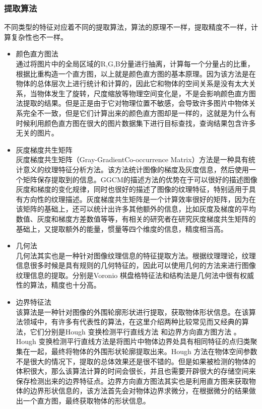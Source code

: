 \subsubsection{提取算法}
不同类型的特征对应着不同的提取算法，算法的原理不一样，提取精度不一样，计算复杂性也不一样。
\begin{itemize}
\item 颜色直方图法\\通过将图片中的全局区域的R,G,B分量进行抽离，计算每一个分量占的比重，根据比重构造一个直方图，以上就是颜色直方图的基本原理。因为该方法是在物体的总体层次上进行统计和计算的，因此它和物体的空间关系是没有太大关系，当物体发生了旋转，尺度缩放等物理空间变化是，不是会影响颜色直方图法提取的结果。但是正是由于它对物理位置不敏感，会导致许多图片中物体关系完全不一致，但是它们计算出来的颜色直方图却是一样的，这就是为什么有时候利用颜色直方图在很大的图片数据集下进行目标查找，查询结果包含许多无关的图片。
\item 灰度梯度共生矩阵\\ 灰度梯度共生矩阵（Gray-GradientCo-occurrence Matrix）方法是一种具有统计意义的纹理特征分析方法。该方法统计图像的梯度及灰度信息，然后使用一个矩阵保存提取到的信息。GGCM的描述方法的优势在于可以很好的描述图像灰度和梯度的变化规律，同时也很好的描述了图像的纹理特征，特别适用于具有方向性的纹理描述。灰度梯度共生矩阵是一个计算效率很好的矩阵，因为在该矩阵的基础上，还可以统计出许多其他额外的信息，比如灰度及梯度的平均数值、灰度和梯度方差数值等等，有相关的研究者在研究灰度梯度共生矩阵的基础上，又提取额外的能量，惯量等四个维度的信息，精度相当高。
\item 几何法\\几何法其实也是一种针对图像纹理信息的特征提取方法。根据纹理理论，纹理信息很多时候是具有规则的几何特征的，因此可以使用几何的方法来进行图像纹理信息的提取。分别是Voronio 棋盘格特征法和结构法是几何法中很有权威性的算法，精度也十分高。
\item 边界特征法\\该算法是一种针对图像的外围轮廓形状进行提取，获取物体形状信息。在该算法领域中，有许多有代表性的算法，在这里介绍两种比较常见而又经典的算法，它们分别是Hough 变换检测平行直线方法 和边界方向直方图方法 。Hough 变换检测平行直线方法是将图片中物体边界处具有相同特征的点归类聚集在一起，最终将物体的外围形状轮廓提取出来。Hough 方法在物体空间参数不是很大的情况下，提取的总体效果还是很不错的。但是如果被检测的物体的体积很大，那么该算法计算的时间会很长，并且也需要开辟很大的存储空间来保存检测出来的边界特征点。边界方向直方图法其实也是利用直方图来获取物体的边界形状信息的，该方法首先会对物体边界求微分，在根据微分的结果做出一个直方图，最终获取物体的形状信息。

\end{itemize}
